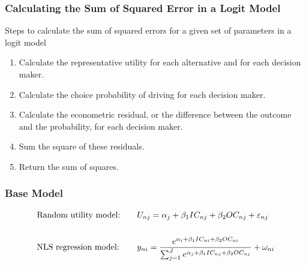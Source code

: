 \documentclass{beamer}\usepackage[]{graphicx}\usepackage[]{color}
\begin{document}
\begin{frame}\frametitle{Calculating the Sum of Squared Error in a Logit Model}
    Steps to calculate the sum of squared errors for a given set of parameters in a logit model
    \begin{enumerate}
        \item Calculate the representative utility for each alternative and for each decision maker.
        \item Calculate the choice probability of driving for each decision maker.
        \item Calculate the econometric residual, or the difference between the outcome and the probability, for each decision maker.
        \item Sum the square of these residuals.
        \item Return the sum of squares.
    \end{enumerate}
\end{frame}

\begin{frame}\frametitle{Base Model}
    \begin{alignat*}{2}
    &\text{Random utility model:} \quad &&U_{nj} = \alpha_j + \beta_1 IC_{nj} + \beta_2 OC_{nj} + \varepsilon_{nj} \\
    \intertext{}
    &\text{NLS regression model:} \quad &&y_{ni} =  \frac{e^{\alpha_i + \beta_1 IC_{ni} + \beta_2 OC_{ni}}}{\sum_{j = 1}^J e^{\alpha_j + \beta_1 IC_{nj} + \beta_2 OC_{nj}}} + \omega_{ni}
    \end{alignat*}
\end{frame}
\end{document}
